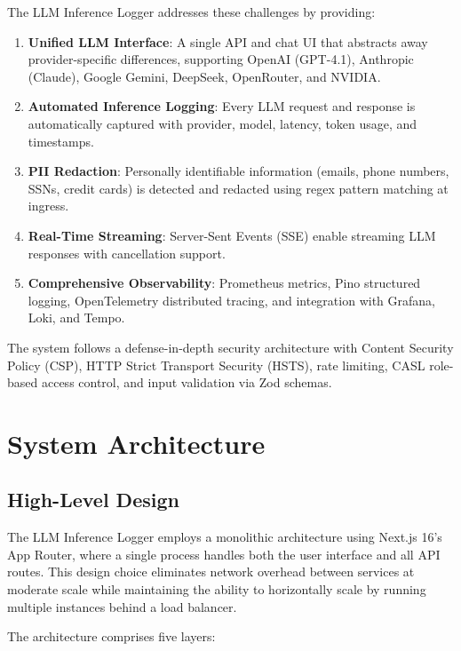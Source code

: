 \documentclass[conference]{IEEEtran}
\begin{document}
The LLM Inference Logger addresses these challenges by providing:

\begin{enumerate}
  \item \textbf{Unified LLM Interface}: A single API and chat UI that abstracts away provider-specific differences, supporting OpenAI (GPT-4.1), Anthropic (Claude), Google Gemini, DeepSeek, OpenRouter, and NVIDIA.
  \item \textbf{Automated Inference Logging}: Every LLM request and response is automatically captured with provider, model, latency, token usage, and timestamps.
  \item \textbf{PII Redaction}: Personally identifiable information (emails, phone numbers, SSNs, credit cards) is detected and redacted using regex pattern matching at ingress.
  \item \textbf{Real-Time Streaming}: Server-Sent Events (SSE) enable streaming LLM responses with cancellation support.
  \item \textbf{Comprehensive Observability}: Prometheus metrics, Pino structured logging, OpenTelemetry distributed tracing, and integration with Grafana, Loki, and Tempo.
\end{enumerate}

The system follows a defense-in-depth security architecture with Content Security Policy (CSP), HTTP Strict Transport Security (HSTS), rate limiting, CASL role-based access control, and input validation via Zod schemas.

\section{System Architecture}

\subsection{High-Level Design}

The LLM Inference Logger employs a monolithic architecture using Next.js 16's App Router, where a single process handles both the user interface and all API routes. This design choice eliminates network overhead between services at moderate scale while maintaining the ability to horizontally scale by running multiple instances behind a load balancer.

The architecture comprises five layers:
\end{document}
